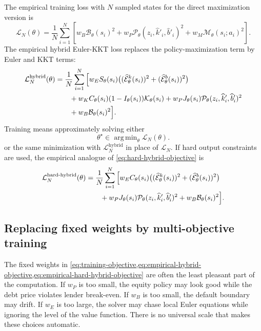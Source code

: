 \documentclass[11pt]{article}
\newcommand{\1}{\mathbf{1}}
\DeclareMathOperator*{\argmin}{arg\,min}
\begin{document}
The empirical training loss with \(N\) sampled states for the direct
maximization version is
\begin{equation}
  \mathcal L_N(\theta)
  =
  \frac{1}{N}\sum_{i=1}^N
  \left[
    w_B \mathcal B_\theta(s_i)^2
    +w_P \mathcal P_\theta(z_i,\widehat k'_i,\widehat b'_i)^2
    +w_M \mathcal M_\theta(s_i;a_i)^2
  \right].
  \label{eq:empirical-objective}
\end{equation}
The empirical hybrid Euler-KKT loss replaces the policy-maximization term by
Euler and KKT terms:
\begin{align}
  \mathcal L^{\mathrm{hybrid}}_N(\theta)
  &=
  \frac{1}{N}\sum_{i=1}^N
  \Big[
    w_E S_\theta(s_i)
      \big((\widehat{\mathcal E}^k_\theta(s_i))^2
      +(\widehat{\mathcal E}^b_\theta(s_i))^2\big) \notag\\
  &\qquad
    +w_KC_\theta(s_i)(1-I_\theta(s_i))\mathcal K_\theta(s_i)
    +w_PJ_\theta(s_i)
      \mathcal P_\theta(z_i,\widehat k'_i,\widehat b'_i)^2 \notag\\
  &\qquad
    +w_B\mathcal B_\theta(s_i)^2
  \Big].
  \label{eq:empirical-hybrid-objective}
\end{align}
Training means approximately solving either
\begin{equation}
  \theta^\star\in \argmin_\theta \mathcal L_N(\theta).
  \label{eq:train-min}
\end{equation}
or the same minimization with \(\mathcal L^{\mathrm{hybrid}}_N\) in place of
\(\mathcal L_N\).
If hard output constraints are used, the empirical analogue of
\cref{eq:hard-hybrid-objective} is
\begin{align}
  \mathcal L^{\mathrm{hard\text{-}hybrid}}_N(\theta)
  &=
  \frac{1}{N}\sum_{i=1}^N
  \Big[
    w_E C_\theta(s_i)
      \big((\widehat{\mathcal E}^k_\theta(s_i))^2
      +(\widehat{\mathcal E}^b_\theta(s_i))^2\big) \notag\\
  &\qquad
    +w_PJ_\theta(s_i)
      \mathcal P_\theta(z_i,\widehat k'_i,\widehat b'_i)^2
    +w_B\mathcal B_\theta(s_i)^2
  \Big].
  \label{eq:empirical-hard-hybrid-objective}
\end{align}

\subsection{Replacing fixed weights by multi-objective training}
\label{subsec:multiobjective-training}

The fixed weights in
\cref{eq:training-objective,eq:empirical-hybrid-objective,eq:empirical-hard-hybrid-objective}
are often the least pleasant part of the computation. If \(w_P\) is too small,
the equity policy may look good while the debt price violates lender break-even.
If \(w_B\) is too small, the default boundary may drift. If \(w_E\) is too large,
the solver may chase local Euler equations while ignoring the level of the value
function. There is no universal scale that makes these choices automatic.
\end{document}

